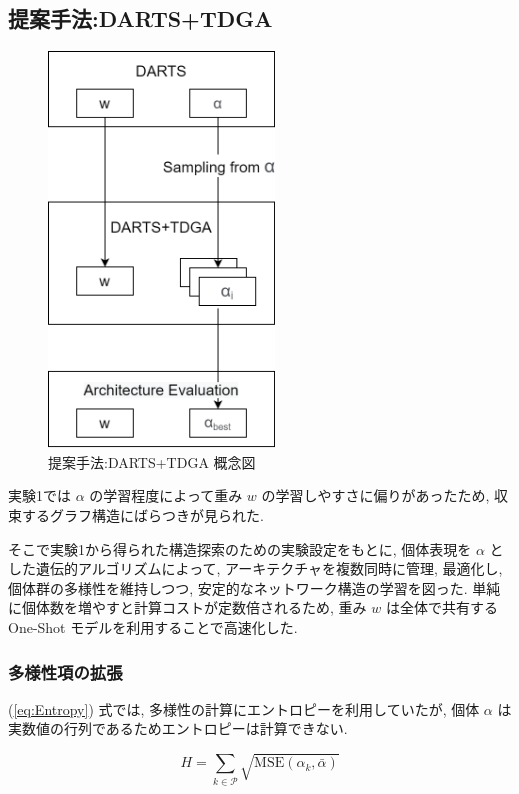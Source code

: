 \clearpage\newpage
\changeindent{0cm}
\subsection{提案手法:DARTS+TDGA}
\label{sec:pred.02}
\changeindent{2cm}

\begin{figure}[t]
  \begin{center}
    \includegraphics[clip,width=6cm]{./fig/03.pred/datdga.png}
  \end{center}
  \caption{提案手法:DARTS+TDGA 概念図}
  \label{fig:image_ga}
\end{figure}

実験1では $\alpha$ の学習程度によって重み $w$ の学習しやすさに偏りがあったため,
収束するグラフ構造にばらつきが見られた.

そこで実験1から得られた構造探索のための実験設定をもとに,
個体表現を $\alpha$ とした遺伝的アルゴリズムによって,
アーキテクチャを複数同時に管理, 最適化し,
個体群の多様性を維持しつつ, 安定的なネットワーク構造の学習を図った.
単純に個体数を増やすと計算コストが定数倍されるため,
重み $w$ は全体で共有する One-Shot モデルを利用することで高速化した.


\subsubsection{多様性項の拡張}
(\ref{eq:Entropy}) 式では, 多様性の計算にエントロピーを利用していたが,
個体 $\alpha$ は実数値の行列であるためエントロピーは計算できない.

\begin{equation}
H = \sum_{k \in \mathcal{P}} \sqrt{\mathrm{MSE}(\alpha_k, \bar{\alpha})} \label{eq:Entropy-new}
\end{equation}

